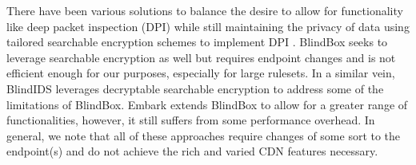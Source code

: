 There have been various solutions to balance the desire to allow for
functionality like deep packet inspection (DPI) while still maintaining the
privacy of data using tailored searchable encryption schemes to implement DPI
\cite{desmoulins2018pattern, sherry2015blindbox, canard2017blindids}.  BlindBox
\cite{sherry2015blindbox} seeks to leverage searchable encryption as well but
requires endpoint changes and is not efficient enough for our purposes,
especially for large rulesets.  In a similar vein, BlindIDS
\cite{canard2017blindids} leverages decryptable searchable encryption to
address some of the limitations of BlindBox.
Embark \cite{lan2016embark} extends BlindBox to allow for a greater range of
functionalities, however, it still suffers from some performance overhead.  In
general, we note that all of these approaches require changes of some sort to
the endpoint(s) and do not achieve the rich and varied CDN features necessary.

%
%
%
%
%

